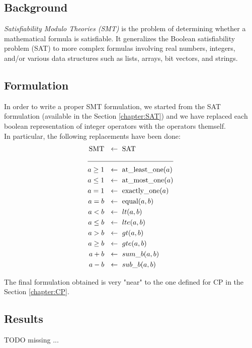 
\subsection{Background}
    \textit{Satisfiability Modulo Theories (SMT)} is the problem of determining whether a
    mathematical formula is satisfiable. It generalizes the Boolean satisfiability problem (SAT) to
    more complex formulas involving real numbers, integers, and/or various data structures such as 
    lists, arrays, bit vectors, and strings.


\subsection{Formulation}
    In order to write a proper SMT formulation, we started from the SAT formulation (available in
    the Section \ref{chapter:SAT}) and we have replaced each boolean representation of integer 
    operators with the operators themself.\\

    In particular, the following replacements have been done:
    \begin{align*}
      \text{SMT} \ &\ \leftarrow\ \text{SAT}      \\
                 \cline{1-2}
        a \geq 1 \ &\ \leftarrow\ \text{at\_least\_one}(a) \\
        a \leq 1 \ &\ \leftarrow\ \text{at\_most\_one}(a)  \\
           a = 1 \ &\ \leftarrow\ \text{exactly\_one}(a)   \\
           a = b \ &\ \leftarrow\ \text{equal}(a,b)        \\
           a < b \ &\ \leftarrow\ lt(a,b)                  \\
        a \leq b \ &\ \leftarrow\ lte(a,b)                 \\
           a > b \ &\ \leftarrow\ gt(a,b)                  \\
        a \geq b \ &\ \leftarrow\ gte(a,b)                 \\
           a + b \ &\ \leftarrow\ sum\_b(a,b)              \\   
           a - b \ &\ \leftarrow\ sub\_b(a,b)                 
    \end{align*}

    The final formulation obtained is very "near" to the one defined for CP in the
    Section \ref{chapter:CP}.


\subsection{Results}
    \colorbox{BurntOrange}{TODO missing ...} \\
